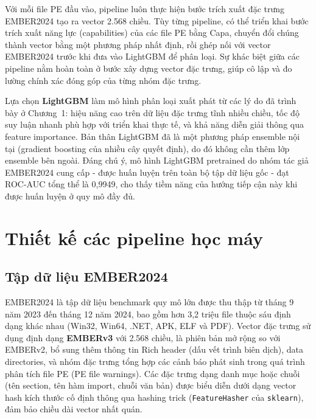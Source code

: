 Với mỗi file PE đầu vào, pipeline luôn thực hiện bước trích xuất đặc
trưng EMBER2024 tạo ra vector 2.568 chiều. Tùy từng pipeline, có thể
triển khai bước trích xuất năng lực (capabilities) của các file PE
bằng Capa, chuyển đổi chúng thành vector bằng một phương pháp nhất định,
rồi ghép nối với vector EMBER2024 trước khi đưa vào LightGBM để phân
loại. Sự khác biệt giữa các pipeline nằm hoàn toàn
ở bước xây dựng vector đặc trưng, giúp cô lập và đo lường chính xác
đóng góp của từng nhóm đặc trưng.

Lựa chọn \textbf{LightGBM} làm mô hình phân loại xuất phát từ các
lý do đã trình bày ở Chương~1: hiệu năng cao trên dữ liệu đặc trưng
tĩnh nhiều chiều, tốc độ suy luận nhanh phù hợp với triển khai thực
tế, và khả năng diễn giải thông qua feature importance. Bản thân
LightGBM đã là một phương pháp ensemble nội tại (gradient boosting
của nhiều cây quyết định), do đó không cần thêm lớp ensemble bên
ngoài. Đáng chú ý, mô hình LightGBM pretrained do nhóm tác giả
EMBER2024 cung cấp - được huấn luyện trên toàn bộ tập dữ liệu gốc
- đạt ROC-AUC tổng thể là 0,9949, cho thấy tiềm năng của hướng
tiếp cận này khi được huấn luyện ở quy mô đầy đủ.













\section{Thiết kế các pipeline học máy}

\subsection{Tập dữ liệu EMBER2024}

EMBER2024 \cite{ember2024benchmark} là tập dữ liệu benchmark quy mô
lớn được thu thập từ tháng 9 năm 2023 đến tháng 12 năm 2024, bao gồm
hơn 3,2 triệu file thuộc sáu định dạng khác nhau (Win32, Win64, .NET,
APK, ELF và PDF). Vector đặc trưng sử dụng định dạng \textbf{EMBERv3}
với 2.568 chiều, là phiên bản mở rộng so với EMBERv2, bổ sung thêm
thông tin Rich header (dấu vết trình biên dịch), data directories,
và nhóm đặc trưng tổng hợp các cảnh báo phát sinh trong quá trình
phân tích file PE (PE file warnings). Các đặc trưng dạng danh mục hoặc chuỗi (tên
section, tên hàm import, chuỗi văn bản) được biểu diễn dưới dạng
vector hash kích thước cố định thông qua hashing trick (\texttt{FeatureHasher} của
\texttt{sklearn}), đảm bảo chiều dài vector nhất quán.

